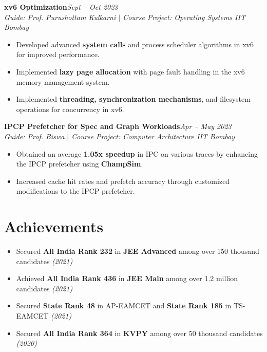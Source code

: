 \documentclass[10pt,a4paper]{article}
\newcommand{\resumeSection}[1]{
    \section*{#1}
}
\newcommand{\resumeEntry}[2]{
    \textbf{#1}\hfill{\small\textit{#2}}\\
}
\newcommand{\resumeSubheading}[1]{
    {\small\textit{#1}}\par
}
\begin{document}
\resumeEntry{xv6 Optimization}{Sept -- Oct 2023}
\resumeSubheading{Guide: Prof. Purushottam Kulkarni $|$ Course Project: Operating Systems \hfill IIT Bombay}

\begin{itemize}
    \item Developed advanced \textbf{system calls} and process scheduler algorithms in xv6 for improved performance.

    \item Implemented \textbf{lazy page allocation} with page fault handling in the xv6 memory management system.

    \item Implemented \textbf{threading, synchronization mechanisms}, and filesystem operations for concurrency in xv6.
\end{itemize}

\resumeEntry{IPCP Prefetcher for Spec and Graph Workloads}{Apr -- May 2023}
\resumeSubheading{Guide: Prof. Biswa $|$ Course Project: Computer Architecture \hfill IIT Bombay}

\begin{itemize}
    \item Obtained an average \textbf{1.05x speedup} in IPC on various traces by enhancing the IPCP prefetcher using \textbf{ChampSim}.

    \item Increased cache hit rates and prefetch accuracy through customized modifications to the IPCP prefetcher.
\end{itemize}


\resumeSection{Achievements}

\begin{itemize}
    \item Secured \textbf{All India Rank 232} in \textbf{JEE Advanced} among over 150 thousand candidates \hfill{\small\textit{(2021)}}

    \item Achieved \textbf{All India Rank 436} in \textbf{JEE Main} among over 1.2 million candidates \hfill{\small\textit{(2021)}}

    \item Secured \textbf{State Rank 48} in AP-EAMCET and \textbf{State Rank 185} in TS-EAMCET \hfill{\small\textit{(2021)}}

    \item Secured \textbf{All India Rank 364} in \textbf{KVPY} among over 50 thousand candidates \hfill{\small\textit{(2020)}}
\end{itemize}
\end{document}

